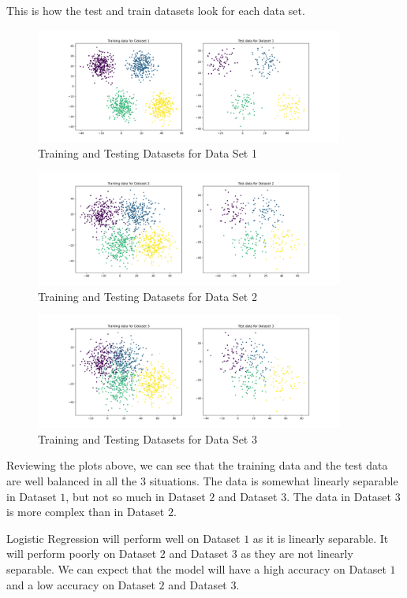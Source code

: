 \clearpage

This is how the test and train datasets look for each data set.

\begin{figure}[H]
    \centering
    \includegraphics[width=0.9\textwidth]{Images/dataset-1-train-test.png}
    \caption{Training and Testing Datasets for Data Set 1}
\end{figure}

\begin{figure}[H]
    \centering
    \includegraphics[width=0.9\textwidth]{Images/dataset-2-train-test.png}
    \caption{Training and Testing Datasets for Data Set 2}
\end{figure}

\begin{figure}[H]
    \centering
    \includegraphics[width=0.9\textwidth]{Images/dataset-3-train-test.png}
    \caption{Training and Testing Datasets for Data Set 3}
\end{figure}

\clearpage

Reviewing the plots above, we can see that the training data and the test data are well balanced in all the $3$ situations. The data is somewhat linearly separable in Dataset $1$, but not so much in Dataset $2$ and Dataset $3$. The data in Dataset $3$ is more complex than in Dataset $2$.

Logistic Regression will perform well on Dataset $1$ as it is linearly separable. It will perform poorly on Dataset $2$ and Dataset $3$ as they are not linearly separable. We can expect that the model will have a high accuracy on Dataset $1$ and a low accuracy on Dataset $2$ and Dataset $3$.




